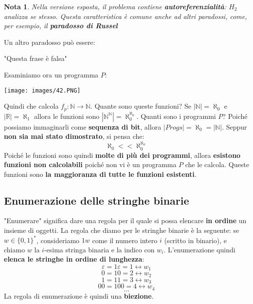 \documentclass[12pt]{article}
\newtheorem{Nota}{Nota}[subsection]
\begin{document}
\begin{Nota}
    Nella versione esposta, il problema contiene \textbf{autoreferenzialità}: $H_2$ analizza se stesso. Questa caratteristica è comune anche ad altri paradossi, come, per esempio, il \textbf{paradosso di Russel}
\end{Nota}
Un altro paradosso può essere:
\begin{center}
    "Questa frase è falsa"
\end{center}
Esaminiamo ora un programma $P$:
\begin{center}
    \texttt{[image: images/42.PNG]}
\end{center}
Quindi che calcola $f_p: \mathbb{N} \rightarrow \mathbb{N}$. Quante sono queste funzioni? Se $|\mathbb{N}| = \aleph_0$ e $|\mathbb{R}| = \aleph_1$ allora le funzioni sono $|\mathbb{N}^\mathbb{N}| = \aleph_0^{\aleph_0}$. Quanti sono i programmi $P$? Poiché possiamo immaginarli come \textbf{sequenza di bit}, allora $|Progs| = \aleph_0 = |\mathbb{N}|$. Seppur \textbf{non sia mai stato dimostrato}, si pensa che:
$$\aleph_0 << \aleph_0^{\aleph_0}$$
Poiché le funzioni sono quindi \textbf{molte di più dei programmi}, allora \textbf{esistono funzioni non calcolabili} poiché non vi è un programma $P$ che le calcola. Queste funzioni sono \textbf{la maggioranza di tutte le funzioni esistenti}.
\subsection{Enumerazione delle stringhe binarie}
"Enumerare" significa dare una regola per il quale si possa elencare \textbf{in ordine} un insieme di oggetti. La regola che diamo per le stringhe binarie è la seguente: \newline
se $w \in \{0, 1\}^*$, consideriamo $1w$ come il numero intero $i$ (scritto in binario), e chiamo $w$ la $i$-esima stringa binaria e la indico con $w_i$. L'enumerazione quindi \textbf{elenca le stringhe in ordine di lunghezza}:
$$\varepsilon = 1\varepsilon = 1 \leftrightarrow w_1$$
$$0 = 10 = 2 \leftrightarrow w_2$$
$$1 = 11 = 3 \leftrightarrow w_3$$
$$00 = 100 = 4 \leftrightarrow w_4$$
$$...$$
La regola di enumerazione è quindi una \textbf{biezione}.
\end{document}
